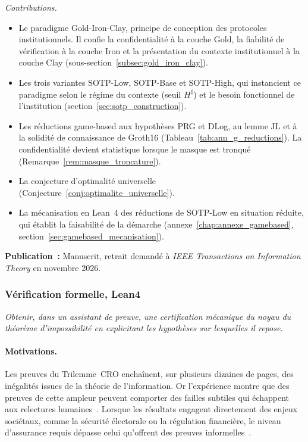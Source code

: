 \begin{sloppypar}
\noindent\textit{Contributions.}
\begin{itemize}
  \item[\textbf{C4.1}] Le paradigme Gold-Iron-Clay, principe de conception des protocoles institutionnels. Il confie la confidentialit\'e \`a la couche Gold, la fiabilit\'e de v\'erification \`a la couche Iron et la pr\'esentation du contexte institutionnel \`a la couche Clay (sous-section~\ref{subsec:gold_iron_clay}).
  \item[\textbf{C4.2}] Les trois variantes SOTP-Low, SOTP-Base et SOTP-High, qui instancient ce paradigme selon le r\'egime du contexte (seuil $H^\sharp$) et le besoin fonctionnel de l'institution (section~\ref{sec:sotp_construction}).
  \item[\textbf{C4.3}] Les r\'eductions game-based aux hypoth\`eses PRG et DLog, au lemme JL et \`a la solidit\'e de connaissance de Groth16 (Tableau~\ref{tab:ann_g_reductions}). La confidentialit\'e devient statistique lorsque le masque est tronqu\'e (Remarque~\ref{rem:masque_troncature}).
  \item[\textbf{C4.4}] La conjecture d'optimalit\'e universelle (Conjecture~\ref{conj:optimalite_universelle}).
  \item[\textbf{C4.5}] La m\'ecanisation en Lean~4 des r\'eductions de SOTP-Low en situation r\'eduite, qui \'etablit la faisabilit\'e de la d\'emarche (annexe~\ref{chap:annexe_gamebased}, section~\ref{sec:gamebased_mecanisation}).
\end{itemize}

\textbf{Publication~:} Manuscrit, retrait demand\'e \`a \textit{IEEE Transactions on Information Theory} en novembre 2026.

\subsubsection{V\'erification formelle, Lean4}
\label{subsubsec:obj5_lean4}

\begin{objectif}\label{obj:obj5_verification}
\textit{Obtenir, dans un assistant de preuve, une certification m\'ecanique du noyau du th\'eor\`eme d'impossibilit\'e en explicitant les hypoth\`eses sur lesquelles il repose.}
\end{objectif}

\paragraph{Motivations.}
Les preuves du Trilemme~CRO encha\^inent, sur plusieurs dizaines de pages,
des in\'egalit\'es issues de la th\'eorie de l'information. Or l'exp\'erience montre
que des preuves de cette ampleur peuvent comporter des failles subtiles qui
\'echappent aux relectures humaines~\cite{Shoup01,Leroy09}.
Lorsque les r\'esultats engagent directement des enjeux soci\'etaux, comme la s\'ecurit\'e
\'electorale ou la r\'egulation financi\`ere, le niveau d'assurance requis d\'epasse
celui qu'offrent des preuves informelles~\cite{BartheEA2013,BhargavanEA2017}.


\end{sloppypar}
